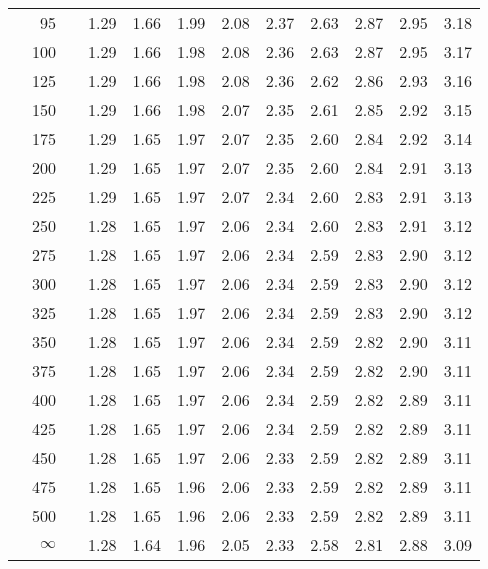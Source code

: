 \documentclass[12pt,letterpaper]{article}
\begin{document}
\begin{center}
\begin{tabular}{|l r | l c c c c c c c c c|}
&95&& 1.29 & 1.66 & 1.99 & 2.08 & 2.37 & 2.63 & 2.87 & 2.95 & 3.18\\ 
&100&& 1.29 & 1.66 & 1.98 & 2.08 & 2.36 & 2.63 & 2.87 & 2.95 & 3.17\\ 
&125&& 1.29 & 1.66 & 1.98 & 2.08 & 2.36 & 2.62 & 2.86 & 2.93 & 3.16\\ 
&150&& 1.29 & 1.66 & 1.98 & 2.07 & 2.35 & 2.61 & 2.85 & 2.92 & 3.15\\ 
&175&& 1.29 & 1.65 & 1.97 & 2.07 & 2.35 & 2.60 & 2.84 & 2.92 & 3.14\\ 
&200&& 1.29 & 1.65 & 1.97 & 2.07 & 2.35 & 2.60 & 2.84 & 2.91 & 3.13\\ 
&225&& 1.29 & 1.65 & 1.97 & 2.07 & 2.34 & 2.60 & 2.83 & 2.91 & 3.13\\ 
&250&& 1.28 & 1.65 & 1.97 & 2.06 & 2.34 & 2.60 & 2.83 & 2.91 & 3.12\\ 
&275&& 1.28 & 1.65 & 1.97 & 2.06 & 2.34 & 2.59 & 2.83 & 2.90 & 3.12\\ 
&300&& 1.28 & 1.65 & 1.97 & 2.06 & 2.34 & 2.59 & 2.83 & 2.90 & 3.12\\ 
&325&& 1.28 & 1.65 & 1.97 & 2.06 & 2.34 & 2.59 & 2.83 & 2.90 & 3.12\\ 
&350&& 1.28 & 1.65 & 1.97 & 2.06 & 2.34 & 2.59 & 2.82 & 2.90 & 3.11\\ 
&375&& 1.28 & 1.65 & 1.97 & 2.06 & 2.34 & 2.59 & 2.82 & 2.90 & 3.11\\ 
&400&& 1.28 & 1.65 & 1.97 & 2.06 & 2.34 & 2.59 & 2.82 & 2.89 & 3.11\\ 
&425&& 1.28 & 1.65 & 1.97 & 2.06 & 2.34 & 2.59 & 2.82 & 2.89 & 3.11\\ 
&450&& 1.28 & 1.65 & 1.97 & 2.06 & 2.33 & 2.59 & 2.82 & 2.89 & 3.11\\ 
&475&& 1.28 & 1.65 & 1.96 & 2.06 & 2.33 & 2.59 & 2.82 & 2.89 & 3.11\\ 
&500&& 1.28 & 1.65 & 1.96 & 2.06 & 2.33 & 2.59 & 2.82 & 2.89 & 3.11\\ 
&$\infty$&& 1.28 & 1.64 & 1.96 & 2.05 & 2.33 & 2.58 & 2.81 & 2.88 & 3.09\\ \hline
\end{tabular}
\end{center}





\end{document}
